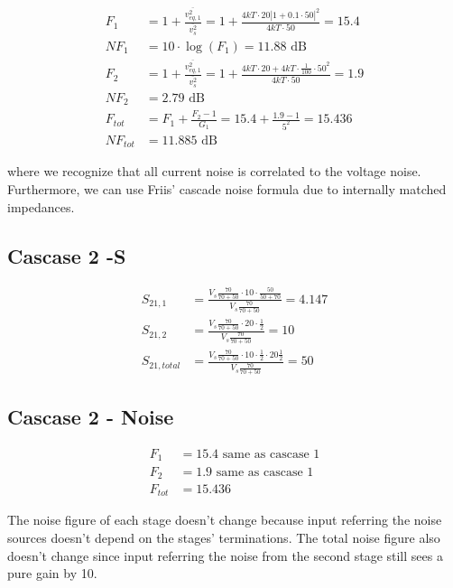 \begin{enumerate}[label=(\alph*)]
    \begin{align*}
        F_1 &= 1 + \frac{\overline{v_{eq,1}^2}}{\overline{v_s^2}} = 1 + \frac{4kT\cdot 20 |1 + 0.1 \cdot 50|^2}{4kT \cdot 50} = 15.4 \\
        NF_1 &= 10 \cdot \log(F_1) = 11.88 \text{ dB} \\
        F_2 &= 1 + \frac{\overline{v_{eq,1}^2}}{\overline{v_s^2}} = 1 + \frac{4kT \cdot 20 + 4kT \cdot \frac{1}{100} \cdot 50^2}{4kT \cdot 50} = 1.9 \\
        NF_2 &= 2.79 \text{ dB} \\
        F_{tot} &= F_1 + \frac{F_2 - 1}{G_1} = 15.4 + \frac{1.9-1}{5^2} = 15.436 \\
        NF_{tot} &= 11.885 \text{ dB}
    \end{align*}

    where we recognize that all current noise is correlated to the voltage noise. Furthermore, we can use Friis' cascade noise formula due to internally matched impedances.

    \subsection{Cascase 2 -S}
    \begin{align*}
        S_{21,1} &= \frac{V_s \frac{70}{70 + 50} \cdot 10 \cdot \frac{50}{50 + 70}}{V_s \frac{70}{70+50}} = 4.147 \\
        S_{21,2} &= \frac{V_s \frac{70}{70 + 50} \cdot 20 \cdot \frac{1}{2}}{V_s \frac{70}{70+50}} = 10 \\
        S_{21,total} &= \frac{V_s \frac{70}{70+50} \cdot 10 \cdot \frac{1}{2} \cdot 20 \frac{1}{2}}{V_s \frac{70}{70+50}} = 50
    \end{align*}

    \subsection{Cascase 2 - Noise}
    \begin{align*}
        F_1 &= 15.4 \text{ same as cascase 1} \\
        F_2 &= 1.9 \text{ same as cascase 1} \\
        F_{tot} &= 15.436
    \end{align*}

    The noise figure of each stage doesn't change because input referring the noise sources doesn't depend on the stages' terminations. The total noise figure also doesn't change since input referring the noise from the second stage still sees a pure gain by 10.


\end{enumerate}
